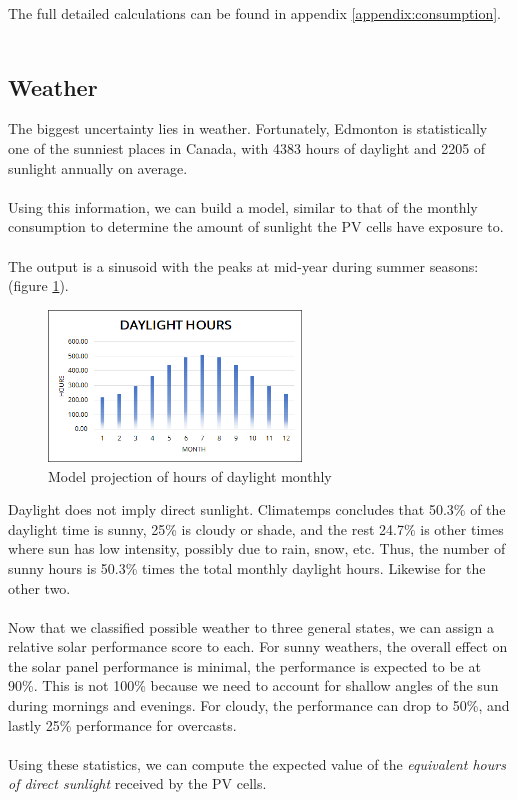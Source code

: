 \documentclass[10pt,letterpaper]{article}
\begin{document}
The full detailed calculations can be found in appendix \ref{appendix:consumption}.\\
\\
\subsection{Weather}\label{subsection:weather}

The biggest uncertainty lies in weather. Fortunately, Edmonton is statistically one of the sunniest places in Canada, with 4383 hours of daylight and 2205 of sunlight annually on average\cite{sunshine-canadian,climatemps}.\\
\\
Using this information, we can build a model, similar to that of the monthly consumption to determine the amount of sunlight the PV cells have exposure to.\\
\\
The output is a sinusoid with the peaks at mid-year during summer seasons: (figure \ref{fig:weather-daylight}).\\

\begin{figure}[H]
	\centering
	\includegraphics[width=0.6\textwidth]{assets/1534567625830}
	\caption{Model projection of hours of daylight monthly}
	\label{fig:weather-daylight}
\end{figure}

Daylight does not imply direct sunlight. Climatemps concludes that 50.3\% of the daylight time is sunny, 25\% is cloudy or shade, and the rest 24.7\% is other times where sun has low intensity, possibly due to rain, snow, etc\cite{climatemps}. Thus, the number of sunny hours is 50.3\% times the total monthly daylight hours. Likewise for the other two.\\
\\
Now that we classified possible weather to three general states, we can assign a relative solar performance score to each. For sunny weathers, the overall effect on the solar panel performance is minimal, the performance is expected to be at 90\%. This is not 100\% because we need to account for shallow angles of the sun during mornings and evenings. For cloudy, the performance can drop to 50\%, and lastly 25\% performance for overcasts.\\
\\
Using these statistics, we can compute the expected value of the \textit{equivalent hours of direct sunlight} received by the PV cells.
\end{document}
